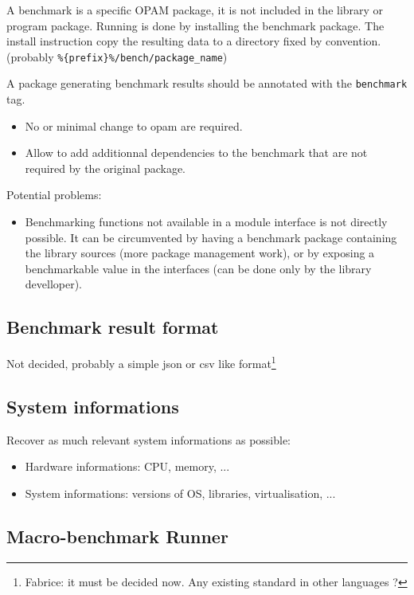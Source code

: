 \documentclass[11pt,a4paper]{article}
\begin{document}
A benchmark is a specific OPAM package, it is not included in the
library or program package. Running is done by installing the
benchmark package. The install instruction copy the resulting data to
a directory fixed by convention. (probably
\texttt{\%\{prefix\}\%/bench/package\_name})

A package generating benchmark results should be annotated with the
\texttt{benchmark} tag.

\begin{itemize}
\item No or minimal change to opam are required.
\item Allow to add additionnal dependencies to the benchmark that are
  not required by the original package.
\end{itemize}

Potential problems:
\begin{itemize}
\item Benchmarking functions not available in a module interface is
  not directly possible. It can be circumvented by having a benchmark
  package containing the library sources (more package management
  work), or by exposing a benchmarkable value in the interfaces (can
  be done only by the library develloper).
\end{itemize}

\subsection{Benchmark result format}

Not decided, probably a simple json or csv like
format\footnote{Fabrice: it must be decided now. Any existing standard
  in other languages ?}

\subsection{System informations}

Recover as much relevant system informations as possible:
\begin{itemize}
\item Hardware informations: CPU, memory, ...
\item System informations: versions of OS, libraries, virtualisation, ...
\end{itemize}

\subsection{Macro-benchmark Runner}
\end{document}
